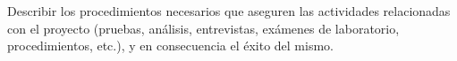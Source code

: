 Describir los procedimientos necesarios que aseguren las actividades relacionadas con el proyecto (pruebas, análisis, entrevistas, exámenes de laboratorio, procedimientos, etc.), y en consecuencia el éxito del mismo.